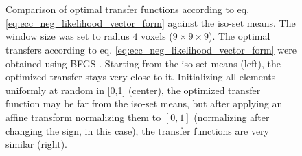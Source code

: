 \begin{figure}[H]
\centering
    \\
    \\
    \caption{{\small Comparison of optimal transfer functions according to eq. \eqref{eq:ecc_neg_likelihood_vector_form} against the iso-set means. The window size was set to radius $4$ voxels ($9\times 9\times 9$). The optimal transfers according to eq. \eqref{eq:ecc_neg_likelihood_vector_form} were obtained using BFGS \citep{GVK502988711}. Starting from the iso-set means (left), the optimized transfer stays very close to it. Initializing all elements uniformly at random in [0,1] (center), the optimized transfer function may be far from the iso-set means, but after applying an affine transform normalizing them to $[0,1]$ (normalizing after changing the sign, in this case), the transfer functions are very similar (right).}}
\label{fig:comparison_optimal_transfers}
\end{figure}


